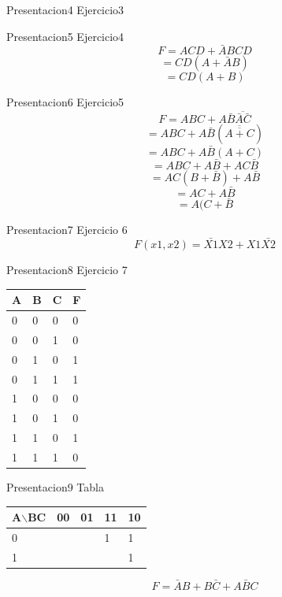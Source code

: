 \documentclass[presentation]{beamer}
\begin{document}
\begin{frame}[label={sec:orge317236}]{Presentacion4}
Ejercicio3
\end{frame}


\begin{frame}[label={sec:org6d4c5b3}]{Presentacion5}
Ejercicio4
$$F = ACD + \bar{A}BCD$$
$$  = CD(A+\bar{A}B)  $$
$$  = CD(A+B)         $$
\end{frame}

\begin{frame}[label={sec:org4e99b24}]{Presentacion6}
Ejercicio5
$$F = ABC + A\bar{B}\overline{\bar{A}\bar{C}}$$                                                        
$$  = ABC + A\bar{B}(\overline{\overline{A + C}})$$                                                        
$$  = ABC + A\bar{B}(A+C)$$
$$  = ABC + A\bar{B} + AC\bar{B}$$
$$  = AC(B + \bar{B}) + A\bar{B}$$
$$  = AC + A\bar{B}$$
$$  = A(C + \bar{B}$$
\end{frame}

\begin{frame}[label={sec:org0421640}]{Presentacion7}
Ejercicio 6
$$F(x1,x2) = \bar{X1}X2 + X1\bar{X2}$$
\end{frame}

\begin{frame}[label={sec:org652b871}]{Presentacion8}
Ejercicio 7
\begin{center}
\begin{tabular}{|l|l|l|l|}
\hline
A & B & C & F \\
\hline
0 & 0 & 0 & 0 \\
\hline
0 & 0 & 1 & 0 \\
\hline
0 & 1 & 0 & 1 \\
\hline
0 & 1 & 1 & 1 \\
\hline
1 & 0 & 0 & 0 \\
\hline
1 & 0 & 1 & 0 \\
\hline
1 & 1 & 0 & 1 \\
\hline
1 & 1 & 1 & 0 \\
\hline
\end{tabular}
\end{center}
\end{frame}

\begin{frame}[label={sec:orge3f7749}]{Presentacion9}
Tabla

\begin{center}
\begin{tabular}{|l|l|l|l|l|}
\hline
A$\backslash$BC & 00 & 01 & 11 & 10 \\
\hline
0 & & & 1 & 1 \\
\hline
1 & & & & 1 \\
\hline
\end{tabular}
\end{center}

$$F = \bar{A}B + B\bar{C}+A\bar{B}C$$
\end{frame}
\end{document}
